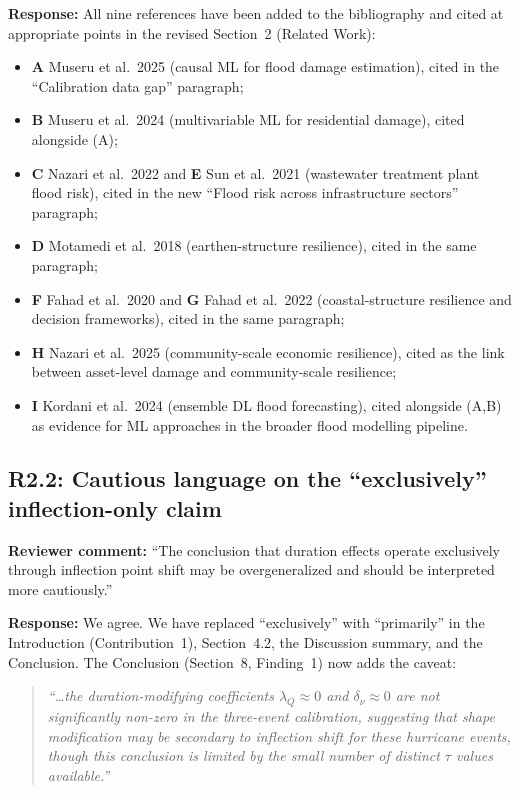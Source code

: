 \documentclass[11pt]{article}
\begin{document}
\textbf{Response:} All nine references have been added to the bibliography and cited at appropriate points in the revised Section~2 (Related Work):
\begin{itemize}
  \item \textbf{A} Museru et al.\ 2025 (causal ML for flood damage estimation), cited in the ``Calibration data gap'' paragraph;
  \item \textbf{B} Museru et al.\ 2024 (multivariable ML for residential damage), cited alongside (A);
  \item \textbf{C} Nazari et al.\ 2022 and \textbf{E} Sun et al.\ 2021 (wastewater treatment plant flood risk), cited in the new ``Flood risk across infrastructure sectors'' paragraph;
  \item \textbf{D} Motamedi et al.\ 2018 (earthen-structure resilience), cited in the same paragraph;
  \item \textbf{F} Fahad et al.\ 2020 and \textbf{G} Fahad et al.\ 2022 (coastal-structure resilience and decision frameworks), cited in the same paragraph;
  \item \textbf{H} Nazari et al.\ 2025 (community-scale economic resilience), cited as the link between asset-level damage and community-scale resilience;
  \item \textbf{I} Kordani et al.\ 2024 (ensemble DL flood forecasting), cited alongside (A,B) as evidence for ML approaches in the broader flood modelling pipeline.
\end{itemize}

\subsection*{R2.2: Cautious language on the ``exclusively'' inflection-only claim}

\textbf{Reviewer comment:} ``The conclusion that duration effects operate exclusively through inflection point shift may be overgeneralized and should be interpreted more cautiously.''

\textbf{Response:} We agree. We have replaced ``exclusively'' with ``primarily'' in the Introduction (Contribution~1), Section~4.2, the Discussion summary, and the Conclusion. The Conclusion (Section~8, Finding~1) now adds the caveat:
\begin{quote}
\textit{``\ldots the duration-modifying coefficients $\lambda_Q \approx 0$ and $\delta_\nu \approx 0$ are not significantly non-zero in the three-event calibration, suggesting that shape modification may be secondary to inflection shift for these hurricane events, though this conclusion is limited by the small number of distinct $\tau$ values available.''}
\end{quote}
\end{document}
